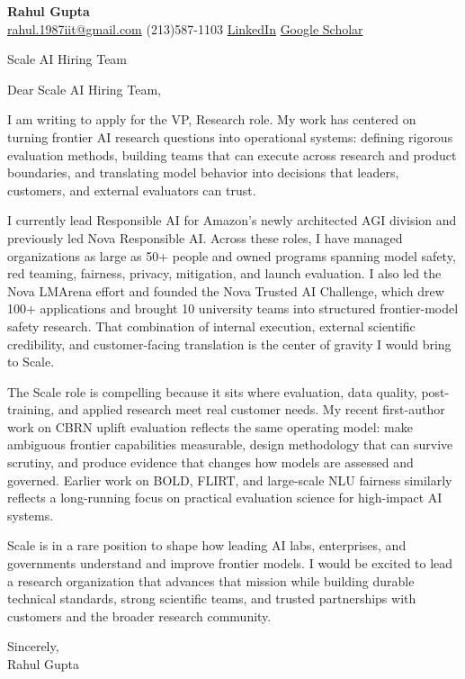 \documentclass[11pt]{article}
\begin{document}
{\Large\bfseries Rahul Gupta}\\[2pt]
\href{mailto:rahul.1987iit@gmail.com}{rahul.1987iit@gmail.com} \quad
(213)587-1103 \quad
\href{https://www.linkedin.com/in/rahul-gupta-16139818}{LinkedIn} \quad
\href{https://scholar.google.com/citations?user=gSTLsFcAAAAJ}{Google Scholar}

\vspace{18pt}

Scale AI Hiring Team

\vspace{8pt}

Dear Scale AI Hiring Team,

I am writing to apply for the VP, Research role. My work has centered on turning frontier AI research questions into operational systems: defining rigorous evaluation methods, building teams that can execute across research and product boundaries, and translating model behavior into decisions that leaders, customers, and external evaluators can trust.

I currently lead Responsible AI for Amazon's newly architected AGI division and previously led Nova Responsible AI. Across these roles, I have managed organizations as large as 50+ people and owned programs spanning model safety, red teaming, fairness, privacy, mitigation, and launch evaluation. I also led the Nova LMArena effort and founded the Nova Trusted AI Challenge, which drew 100+ applications and brought 10 university teams into structured frontier-model safety research. That combination of internal execution, external scientific credibility, and customer-facing translation is the center of gravity I would bring to Scale.

The Scale role is compelling because it sits where evaluation, data quality, post-training, and applied research meet real customer needs. My recent first-author work on CBRN uplift evaluation reflects the same operating model: make ambiguous frontier capabilities measurable, design methodology that can survive scrutiny, and produce evidence that changes how models are assessed and governed. Earlier work on BOLD, FLIRT, and large-scale NLU fairness similarly reflects a long-running focus on practical evaluation science for high-impact AI systems.

Scale is in a rare position to shape how leading AI labs, enterprises, and governments understand and improve frontier models. I would be excited to lead a research organization that advances that mission while building durable technical standards, strong scientific teams, and trusted partnerships with customers and the broader research community.

Sincerely,\\[18pt]
Rahul Gupta
\end{document}
